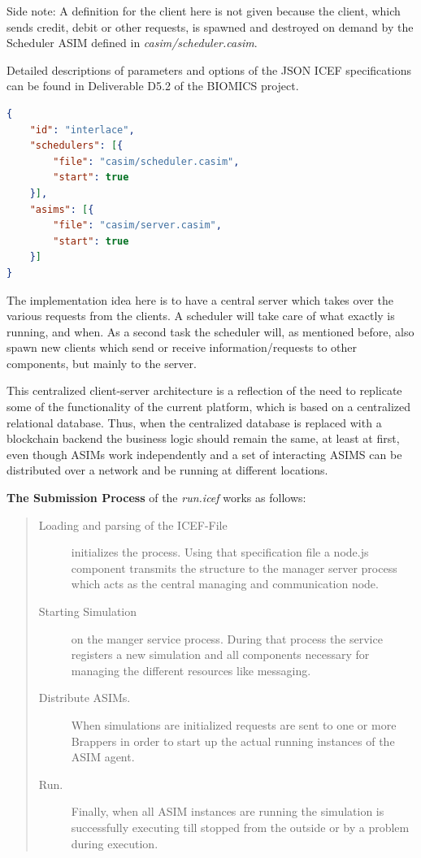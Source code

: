 Side note: A definition for the client here is not given because the client, which sends credit, debit or other requests, is spawned and destroyed on demand by the Scheduler ASIM defined in \textit{casim/scheduler.casim}.

Detailed descriptions of parameters and options of the JSON ICEF specifications can be found in Deliverable D5.2 \cite{BIOMICSD52} of the BIOMICS project.

\begin{center}
\begin{minipage}{0.8\textwidth}
\small
\begin{lstlisting}[language=json,firstnumber=1,caption={\bf\small Example ICEF JSON Specification},captionpos=b,label=lst:icef-json-spec]
{
    "id": "interlace", 
    "schedulers": [{
        "file": "casim/scheduler.casim",
        "start": true
    }], 
    "asims": [{
        "file": "casim/server.casim",
        "start": true
    }]
}
\end{lstlisting}
\end{minipage}
\end{center}

The implementation idea here is to have a central server which takes over the various requests from the clients. A scheduler will take care of what exactly is running, and when. As a second task the scheduler will, as mentioned before, also spawn new clients which send or receive information/requests to other components, but mainly to the server.

This centralized client-server architecture is a reflection of the need to replicate some of the functionality of the current platform, which is based on a centralized relational database. Thus, when the centralized database is replaced with a blockchain backend the business logic should remain the same, at least at first, even though ASIMs work independently and a set of interacting ASIMS can be distributed over a network and be running at different locations. 

\textbf{The Submission Process} of the \textit{run.icef} works as follows:
\begin{quote}
\small
\begin{description}
	\item [Loading and parsing of the ICEF-File] initializes the process. Using that specification file a node.js component transmits the structure to the manager server process which acts as the central managing and communication node.
	\item [Starting Simulation] on the manger service process. During that process the service registers a new simulation and all components necessary for managing the different resources like messaging.
	\item [Distribute ASIMs.] When simulations are initialized requests are sent to one or more Brappers in order to start up the actual running instances of the ASIM agent.
	\item [Run.] Finally, when all ASIM instances are running the simulation is successfully executing till stopped from the outside or by a problem during execution.
\end{description}
\end{quote}

